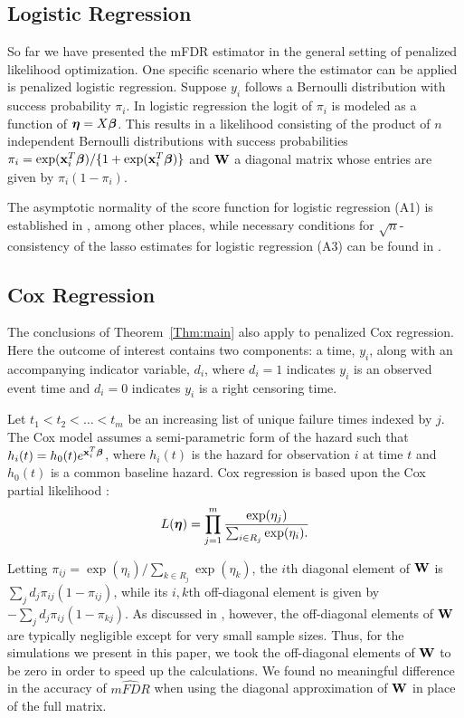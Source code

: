 \subsection{Logistic Regression}

So far we have presented the mFDR estimator in the general setting of penalized likelihood optimization. One specific scenario where the estimator can be applied is penalized logistic regression. Suppose $y_i$ follows a Bernoulli distribution with success probability $\pi_i$. In logistic regression the logit of $\pi_i$ is modeled as a function of $\boldsymbol{\eta} = X\boldsymbol{\beta}$.  This results in a likelihood consisting of the product of $n$ independent Bernoulli distributions with success probabilities $\pi_i = \exp(\mathbf{x}_i^T\boldsymbol{\beta})/\{1 + \exp(\mathbf{x}_i^T\boldsymbol{\beta})\}$ and $\mathbf{W}$ a diagonal matrix whose entries are given by $\pi_i(1-\pi_i)$.

The asymptotic normality of the score function for logistic regression (A1) is established in \citet{McCullagh1989}, among other places, while necessary conditions for $\sqrt{n}$-consistency of the lasso estimates for logistic regression (A3) can be found in \citet{SCAD}.

\subsection{Cox Regression}
\label{Sec:cox}

The conclusions of Theorem~\ref{Thm:main} also apply to penalized Cox regression. Here the outcome of interest contains two components: a time, $y_i$, along with an accompanying indicator variable, $d_i$, where $d_i = 1$ indicates $y_i$ is an observed event time and $d_i = 0$ indicates $y_i$ is a right censoring time.

Let $t_1 < t_2 < \ldots < t_m$ be an increasing list of unique failure times indexed by $j$. The Cox model assumes a semi-parametric form of the hazard such that $h_i(t) = h_0(t)e^{\mathbf{x}_i^T \boldsymbol{\beta}}$, where $h_i(t)$ is the hazard for observation $i$ at time $t$ and $h_0(t)$ is a common baseline hazard. Cox regression is based upon the Cox partial likelihood \citep{Cox1972}:
\begin{equation*}
L(\boldsymbol{\eta})  = \prod_{j=1}^{m} \frac{\exp(\eta_j)}{\sum_{i \in R_j} \exp(\eta_i).} 
\end{equation*}

Letting $\pi_{ij} = \exp(\eta_i)/\sum_{k \in R_j}\exp(\eta_k)$, the $i$th diagonal element of $\mathbf{W}$ is $\sum_j d_j\pi_{ij}(1-\pi_{ij})$, while its $i,k$th off-diagonal element is given by $-\sum_j d_j\pi_{ij}(1-\pi_{kj})$.  As discussed in \citet{Simon2011}, however, the off-diagonal elements of $\mathbf{W}$ are typically negligible except for very small sample sizes.  Thus, for the simulations we present in this paper, we took the off-diagonal elements of $\mathbf{W}$ to be zero in order to speed up the calculations.  We found no meaningful difference in the accuracy of $\widehat{mFDR}$ when using the diagonal approximation of $\mathbf{W}$ in place of the full matrix.

